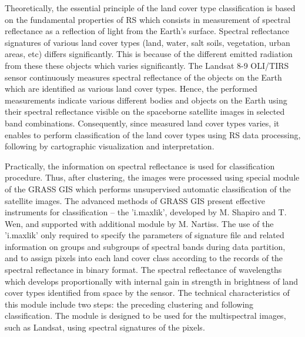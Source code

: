 \documentclass[environments,article,submit,pdftex,moreauthors]{Definitions/mdpi}
\begin{document}
Theoretically, the essential  principle of the land cover type classification is based on the fundamental properties of RS which consists in measurement of spectral reflectance as a reflection of light from the Earth's surface. Spectral reflectance signatures of various land cover types (land, water, salt soils, vegetation, urban areas, etc) differs significantly. This is because of the different emitted radiation from these these objects which varies significantly. The Landsat 8-9 OLI/TIRS sensor continuously measures spectral reflectance of the objects on the Earth which are identified as various land cover types. Hence, the performed measurements indicate various different bodies and objects on the Earth using their spectral reflectance visible on the spaceborne satellite images in selected band combinations. Consequently, since measured land cover types varies, it enables to perform classification of the land cover types using RS data processing, following by cartographic visualization and interpretation. 

Practically, the information on spectral reflectance is used for classification procedure. Thus, after clustering, the images were processed using special module of the GRASS GIS which performs unsupervised automatic classification of the satellite images. The advanced methods of GRASS GIS present effective instruments for classification -- the 'i.maxlik', developed by M. Shapiro and T. Wen, and supported with additional module by M. Nartiss. The use of the 'i.maxlik' only required to specify the parameters of signature file and related information on groups and subgroups of spectral bands during data partition, and to assign pixels into each land cover class according to the records of the spectral reflectance in binary format. The spectral reflectance of wavelengths which develops proportionally with internal gain in strength in brightness of land cover types identified from space by the sensor. The technical characteristics of this module include two steps: the preceding clustering and following classification. The module is designed to be used for the multispectral images, such as Landsat, using spectral signatures of the pixels. 
\end{document}
